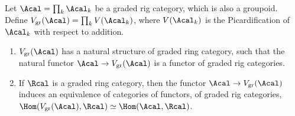 \begin{proposition}\label{prop:rig-to-ring-2}
Let $\Acal=\prod_{k}\Acal_{k}$ be a graded rig category, which is also a groupoid. Define $V_{\mathrm{gr}}(\Acal)=\prod_{k}V(\Acal_{k})$, where $V(\Acal_{k})$ is the Picardification of $\Acal_{k}$ with respect to addition.
\begin{enumerate}
\item $V_{\mathrm{gr}}(\Acal)$ has a natural structure of graded ring category, such that the natural functor $\Acal\to V_{\mathrm{gr}}(\Acal)$ is a functor of graded rig categories.
\item If $\Rcal$ is a graded ring category, then the functor $\Acal\to V_{\mathrm{gr}}(\Acal)$ induces an equivalence of categories of functors, of graded rig categories, $\Hom(V_{\mathrm{gr}}(\Acal),\Rcal)\simeq\Hom(\Acal,\Rcal)$.
\end{enumerate}
\end{proposition}

